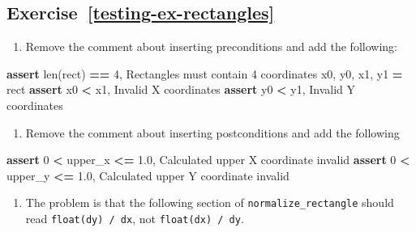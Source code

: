 \documentclass[
]{krantz}
\makeatletter
\newenvironment{Shaded}{\begin{snugshade}}{\end{snugshade}}
\newcommand{\BuiltInTok}[1]{#1}
\newcommand{\ControlFlowTok}[1]{\textcolor[rgb]{0.13,0.29,0.53}{\textbf{#1}}}
\newcommand{\DecValTok}[1]{\textcolor[rgb]{0.00,0.00,0.81}{#1}}
\newcommand{\FloatTok}[1]{\textcolor[rgb]{0.00,0.00,0.81}{#1}}
\newcommand{\NormalTok}[1]{#1}
\newcommand{\OperatorTok}[1]{\textcolor[rgb]{0.81,0.36,0.00}{\textbf{#1}}}
\newcommand{\StringTok}[1]{\textcolor[rgb]{0.31,0.60,0.02}{#1}}
\providecommand{\tightlist}{%
  \setlength{\itemsep}{0pt}\setlength{\parskip}{0pt}}
\newenvironment{kframe}{%
\medskip{}
\setlength{\fboxsep}{.8em}
 \def\at@end@of@kframe{}%
 \ifinner\ifhmode%
  \def\at@end@of@kframe{\end{minipage}}%
  \begin{minipage}{\columnwidth}%
 \fi\fi%
 \def\FrameCommand##1{\hskip\@totalleftmargin \hskip-\fboxsep
 \colorbox{shadecolor}{##1}\hskip-\fboxsep
     \hskip-\linewidth \hskip-\@totalleftmargin \hskip\columnwidth}%
 \MakeFramed {\advance\hsize-\width
   \@totalleftmargin\z@ \linewidth\hsize
   \@setminipage}}%
 {\par\unskip\endMakeFramed%
 \at@end@of@kframe}
\renewenvironment{Shaded}{\begin{kframe}}{\end{kframe}}
\makeatother
\begin{document}
\hypertarget{exercise-reftesting-ex-rectangles}{%
\subsection*{Exercise~\ref{testing-ex-rectangles}}\label{exercise-reftesting-ex-rectangles}}


\begin{enumerate}
\def\labelenumi{\arabic{enumi}.}
\tightlist
\item
  Remove the comment about inserting preconditions and add the following:
\end{enumerate}

\begin{Shaded}
\begin{Highlighting}[]
\ControlFlowTok{assert} \BuiltInTok{len}\NormalTok{(rect) }\OperatorTok{==} \DecValTok{4}\NormalTok{, }\StringTok{\textquotesingle{}Rectangles must contain 4 coordinates\textquotesingle{}}
\NormalTok{x0, y0, x1, y1 }\OperatorTok{=}\NormalTok{ rect}
\ControlFlowTok{assert}\NormalTok{ x0 }\OperatorTok{\textless{}}\NormalTok{ x1, }\StringTok{\textquotesingle{}Invalid X coordinates\textquotesingle{}}
\ControlFlowTok{assert}\NormalTok{ y0 }\OperatorTok{\textless{}}\NormalTok{ y1, }\StringTok{\textquotesingle{}Invalid Y coordinates\textquotesingle{}}
\end{Highlighting}
\end{Shaded}

\begin{enumerate}
\def\labelenumi{\arabic{enumi}.}
\setcounter{enumi}{1}
\tightlist
\item
  Remove the comment about inserting postconditions and add the following
\end{enumerate}

\begin{Shaded}
\begin{Highlighting}[]
\ControlFlowTok{assert} \DecValTok{0} \OperatorTok{\textless{}}\NormalTok{ upper\_x }\OperatorTok{\textless{}=} \FloatTok{1.0}\NormalTok{, }\StringTok{\textquotesingle{}Calculated upper X coordinate invalid\textquotesingle{}}
\ControlFlowTok{assert} \DecValTok{0} \OperatorTok{\textless{}}\NormalTok{ upper\_y }\OperatorTok{\textless{}=} \FloatTok{1.0}\NormalTok{, }\StringTok{\textquotesingle{}Calculated upper Y coordinate invalid\textquotesingle{}}
\end{Highlighting}
\end{Shaded}

\begin{enumerate}
\def\labelenumi{\arabic{enumi}.}
\setcounter{enumi}{2}
\tightlist
\item
  The problem is that the following section of \texttt{normalize\_rectangle}
  should read \texttt{float(dy)\ /\ dx}, not \texttt{float(dx)\ /\ dy}.
\end{enumerate}
\end{document}

